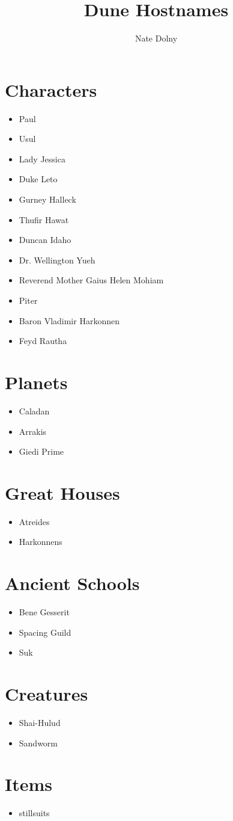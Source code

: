\documentclass{article}
\title{\textbf{Dune Hostnames}}
\author{Nate Dolny}
\date{}
\begin{document}
\maketitle

\section{Characters}
\begin{itemize}
\item Paul
\item Usul
\item Lady Jessica
\item Duke Leto
\item Gurney Halleck 
\item Thufir Hawat
\item Duncan Idaho 
\item Dr. Wellington Yueh
\item Reverend Mother Gaius Helen Mohiam
\item Piter
\item Baron Vladimir Harkonnen 
\item Feyd Rautha
\end{itemize}

\section{Planets}
\begin{itemize}
\item Caladan 
\item Arrakis
\item Giedi Prime
\end{itemize}

\section{Great Houses}
\begin{itemize}
\item Atreides 
\item Harkonnens
\end{itemize}

\section{Ancient Schools}
\begin{itemize}
\item Bene Gesserit 
\item Spacing Guild
\item Suk
\end{itemize}

\section{Creatures}
\begin{itemize}
\item Shai-Hulud
\item Sandworm 
\end{itemize}

\section{Items}
\begin{itemize}
\item stillsuits
\end{itemize}
\end{document}
